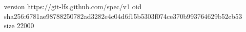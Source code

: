version https://git-lfs.github.com/spec/v1
oid sha256:6781ae98788250782ad3282e4c04d6f15b5303f074ce370b993764629b52cb53
size 22000

